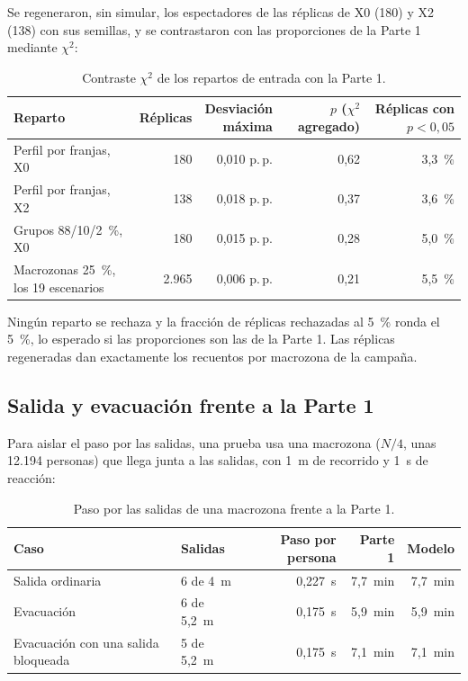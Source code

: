 Se regeneraron, sin simular, los espectadores de las réplicas de X0 (180) y X2
(138) con sus semillas, y se contrastaron con las proporciones de la Parte 1
mediante $\chi^2$:

\begin{table}[htbp]
\centering\small
\caption{Contraste $\chi^2$ de los repartos de entrada con la Parte 1.}
\label{tab:repartos}
\begin{tabular}{@{}lrrrr@{}}
\toprule
Reparto & Réplicas & \makecell[r]{Desviación\\máxima} & \makecell[r]{$p$ ($\chi^2$\\agregado)} & \makecell[r]{Réplicas\\con $p<0{,}05$} \\
\midrule
Perfil por franjas, X0 & 180 & 0,010 p.\,p. & 0,62 & 3,3~\% \\
Perfil por franjas, X2 & 138 & 0,018 p.\,p. & 0,37 & 3,6~\% \\
Grupos 88/10/2~\%, X0 & 180 & 0,015 p.\,p. & 0,28 & 5,0~\% \\
Macrozonas 25~\%, los 19 escenarios & 2.965 & 0,006 p.\,p. & 0,21 & 5,5~\% \\
\bottomrule
\end{tabular}
\end{table}

Ningún reparto se rechaza y la fracción de réplicas rechazadas al 5~\% ronda el
5~\%, lo esperado si las proporciones son las de la Parte 1. Las réplicas
regeneradas dan exactamente los recuentos por macrozona de la campaña.

\subsection{Salida y evacuación frente a la Parte 1}

Para aislar el paso por las salidas, una prueba usa una macrozona ($N/4$, unas
12.194 personas) que llega junta a las salidas, con 1~m de recorrido y 1~s de
reacción:

\begin{table}[htbp]
\centering\small
\caption{Paso por las salidas de una macrozona frente a la Parte 1.}
\label{tab:salidas}
\begin{tabular}{@{}llrrr@{}}
\toprule
Caso & Salidas & Paso por persona & Parte 1 & Modelo \\
\midrule
Salida ordinaria & 6 de 4~m & 0,227~s & 7,7~min & 7,7~min \\
Evacuación & 6 de 5,2~m & 0,175~s & 5,9~min & 5,9~min \\
Evacuación con una salida bloqueada & 5 de 5,2~m & 0,175~s & 7,1~min & 7,1~min \\
\bottomrule
\end{tabular}
\end{table}

